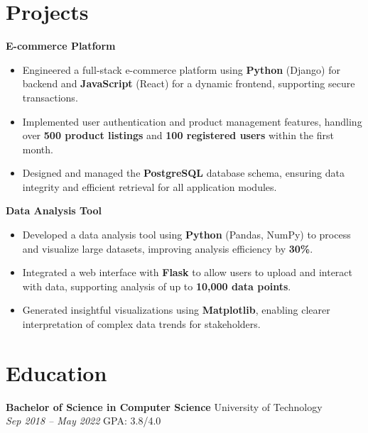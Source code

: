 \documentclass{article}
\newcommand{\resheading}[1]{\section*{#1}\vspace{-1.5em}}
\newcommand{\ressubheading}[1]{\textbf{#1}} %
\begin{document}
\resheading{Projects}
\ressubheading{E-commerce Platform}
\begin{itemize}
    \item Engineered a full-stack e-commerce platform using \textbf{Python} (Django) for backend and \textbf{JavaScript} (React) for a dynamic frontend, supporting secure transactions.
    \item Implemented user authentication and product management features, handling over \textbf{500 product listings} and \textbf{100 registered users} within the first month.
    \item Designed and managed the \textbf{PostgreSQL} database schema, ensuring data integrity and efficient retrieval for all application modules.
\end{itemize}

\vspace{0.5em} %

\ressubheading{Data Analysis Tool}
\begin{itemize}
    \item Developed a data analysis tool using \textbf{Python} (Pandas, NumPy) to process and visualize large datasets, improving analysis efficiency by \textbf{30\%}.
    \item Integrated a web interface with \textbf{Flask} to allow users to upload and interact with data, supporting analysis of up to \textbf{10,000 data points}.
    \item Generated insightful visualizations using \textbf{Matplotlib}, enabling clearer interpretation of complex data trends for stakeholders.
\end{itemize}

\resheading{Education}
\ressubheading{Bachelor of Science in Computer Science} \hfill University of Technology \\
\textit{Sep 2018 – May 2022} \hfill GPA: 3.8/4.0
\end{document}
